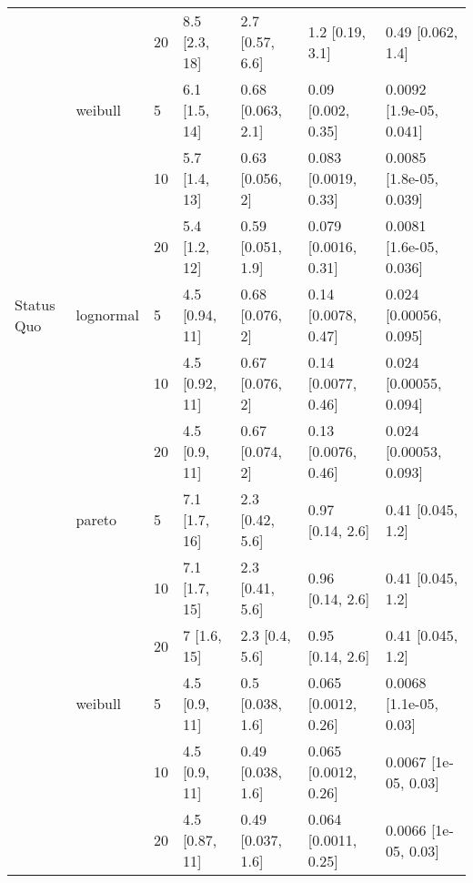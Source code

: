 \begin{tabular}{lllllll}
           &         & 20 &     8.5 [2.3, 18] &    2.7 [0.57, 6.6] &        1.2 [0.19, 3.1] &        0.49 [0.062, 1.4] \\
           & weibull & 5  &     6.1 [1.5, 14] &  0.68 [0.063, 2.1] &     0.09 [0.002, 0.35] &  0.0092 [1.9e-05, 0.041] \\
           &         & 10 &     5.7 [1.4, 13] &    0.63 [0.056, 2] &   0.083 [0.0019, 0.33] &  0.0085 [1.8e-05, 0.039] \\
           &         & 20 &     5.4 [1.2, 12] &  0.59 [0.051, 1.9] &   0.079 [0.0016, 0.31] &  0.0081 [1.6e-05, 0.036] \\
Status Quo & lognormal & 5  &    4.5 [0.94, 11] &    0.68 [0.076, 2] &    0.14 [0.0078, 0.47] &   0.024 [0.00056, 0.095] \\
           &         & 10 &    4.5 [0.92, 11] &    0.67 [0.076, 2] &    0.14 [0.0077, 0.46] &   0.024 [0.00055, 0.094] \\
           &         & 20 &     4.5 [0.9, 11] &    0.67 [0.074, 2] &    0.13 [0.0076, 0.46] &   0.024 [0.00053, 0.093] \\
           & pareto & 5  &     7.1 [1.7, 16] &    2.3 [0.42, 5.6] &       0.97 [0.14, 2.6] &        0.41 [0.045, 1.2] \\
           &         & 10 &     7.1 [1.7, 15] &    2.3 [0.41, 5.6] &       0.96 [0.14, 2.6] &        0.41 [0.045, 1.2] \\
           &         & 20 &       7 [1.6, 15] &     2.3 [0.4, 5.6] &       0.95 [0.14, 2.6] &        0.41 [0.045, 1.2] \\
           & weibull & 5  &     4.5 [0.9, 11] &   0.5 [0.038, 1.6] &   0.065 [0.0012, 0.26] &   0.0068 [1.1e-05, 0.03] \\
           &         & 10 &     4.5 [0.9, 11] &  0.49 [0.038, 1.6] &   0.065 [0.0012, 0.26] &     0.0067 [1e-05, 0.03] \\
           &         & 20 &    4.5 [0.87, 11] &  0.49 [0.037, 1.6] &   0.064 [0.0011, 0.25] &     0.0066 [1e-05, 0.03] \\
\bottomrule
\end{tabular}
